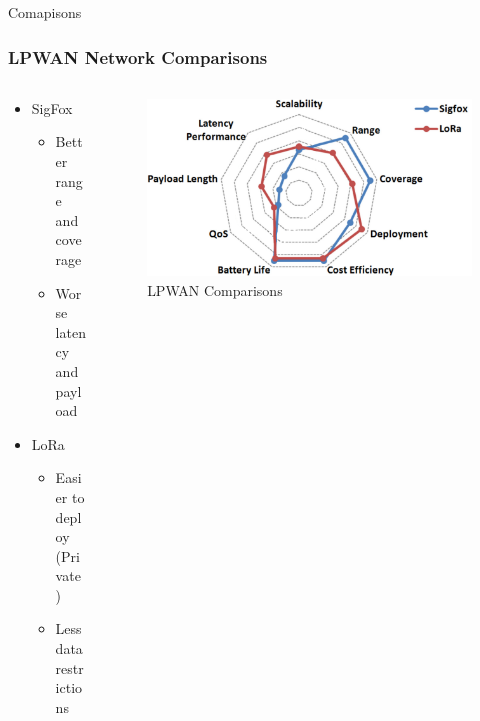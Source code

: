 \documentclass{beamer}
\begin{document}
\begin{frame}{Comapisons}
  \frametitle{LPWAN Network Comparisons}
  \begin{columns}
    \begin{column}{0.5\textwidth}
      \begin{itemize}
        \item SigFox
        \begin{itemize}
          \item Better range and coverage
          \item Worse latency and payload
        \end{itemize}
        \item LoRa
        \begin{itemize}
          \item Easier to deploy (Private)
          \item Less data restrictions
        \end{itemize}
      \end{itemize}
    \end{column}
    \begin{column}{0.5\textwidth}
      \begin{figure}[htbp]
        \centering
        \includegraphics[width=\textwidth]{images/LPWAN_comparisons.png}
        \caption{LPWAN Comparisons \cite{mekki2019comparative}}
        \label{fig:LPWAN_Comparisons_map}
      \end{figure}
    \end{column}
  \end{columns}
\end{frame}
\end{document}
